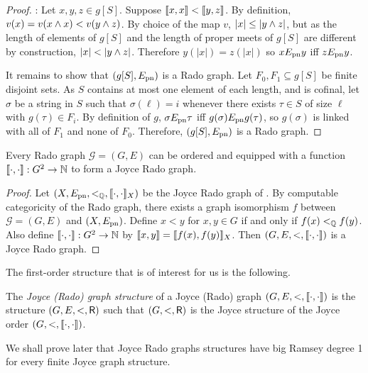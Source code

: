 \begin{proof}
: Let $x,y,z\in g[S]$. Suppose $\llbracket x , x \rrbracket < \llbracket y , z \rrbracket$. By definition, $v(x)=v(x \wedge x) < v(y \wedge z)$. By choice of the map $v$,  $|x| \leq |y \wedge z|$, but as the length of elements of $g[S]$ and the length of proper meets of $g[S]$ are different by construction, $|x| < |y \wedge z|$. Therefore $y(|x|)=z(|x|) $ so $x E_{\mathrm{pn}} y$ iff $z E_{\mathrm{pn}} y$.

It remains to show that $(g[S], E_{\mathrm{pn}})$ is a Rado graph. Let $F_0,F_1\subseteq g[S]$ be finite disjoint sets. As $S$ contains at most one element of each length, and is cofinal, let $\sigma$ be a string in $S$ such that $\sigma(\ell)=i$ whenever there exists $\tau\in S$ of size $\ell$ with $g(\tau)\in F_i$. By definition of $g$, $\sigma E_{\mathrm{pn}}\tau$ iff $g(\sigma)E_{\mathrm{pn}} g(\tau)$, so $g(\sigma)$ is linked with all of $F_1$ and none of $F_0$. Therefore, $(g[S], E_{\mathrm{pn}})$ is a Rado graph.

\end{proof}


\begin{corollary}[$\RCA_0$]\label{cor:rado-can-be-enriched}
Every Rado graph $\mathcal{G} = (G,E)$ can be ordered and equipped with a function $\llbracket \cdot , \cdot \rrbracket: G^2\to \mathbb{N}$ to form a Joyce Rado graph.
\end{corollary}
\begin{proof}
Let $(X, E_{\mathrm{pn}}, <_{\mathbb{Q}}, \llbracket \cdot , \cdot \rrbracket_X)$ be the Joyce Rado graph of . By computable categoricity of the Rado graph, there
exists a graph isomorphism $f$ between $\mathcal{G} = (G, E)$ and $(X, E_{\mathrm{pn}})$.
Define $x < y$ for $x, y \in G$ if and only if $f(x) <_{\mathbb{Q}} f(y)$.
Also define $\llbracket \cdot , \cdot \rrbracket: G^2 \to \mathbb{N}$ by $\llbracket x , y \rrbracket = \llbracket f(x) , f(y) \rrbracket_X$.
Then $(G, E, <, \llbracket \cdot , \cdot \rrbracket)$ is a Joyce Rado graph.
\end{proof}


The first-order structure that is of interest for us is the following.
\begin{definition}
  The \emph{Joyce (Rado) graph structure} of a Joyce (Rado) graph $(G,E,<, \llbracket \cdot , \cdot \rrbracket)$ is the structure $(G,E,<,\mathsf{R})$ such that $(G,<,\mathsf{R})$ is the Joyce structure of the
  Joyce order $(G,<, \llbracket \cdot , \cdot \rrbracket)$. %
\end{definition}
We shall prove later that Joyce Rado graphs structures have big Ramsey degree 1 for every finite Joyce graph structure.

